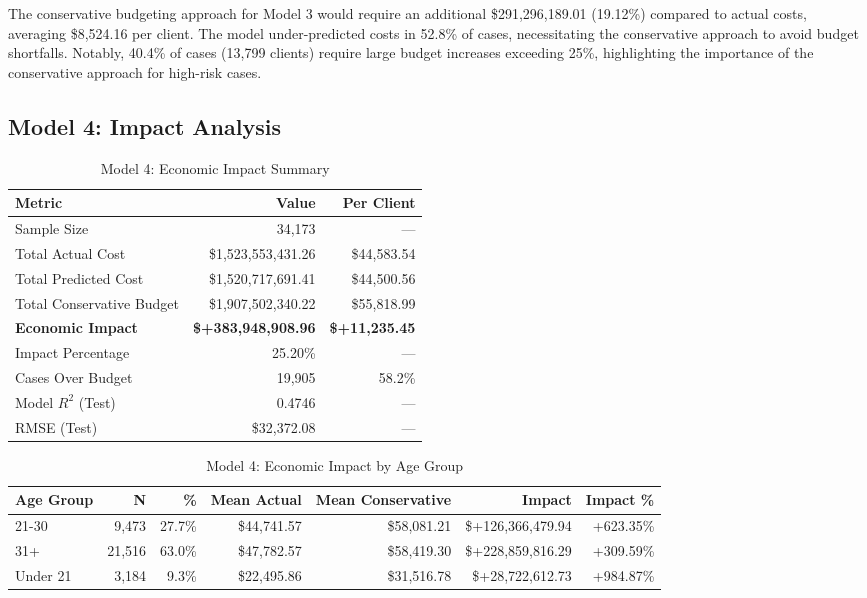 The conservative budgeting approach for Model 3 would require an additional \$291,296,189.01 (19.12\%) compared to actual costs, averaging \$8,524.16 per client. The model under-predicted costs in 52.8\% of cases, necessitating the conservative approach to avoid budget shortfalls. Notably, 40.4\% of cases (13,799 clients) require large budget increases exceeding 25\%, highlighting the importance of the conservative approach for high-risk cases. 

\clearpage

\subsection{Model 4: Impact Analysis}
\label{subsec:model4_impact}

\begin{table}[htbp]
\centering
\small
\caption{Model 4: Economic Impact Summary}
\label{tab:model4_impact_summary}
\begin{tabular}{lrr}
\toprule
\textbf{Metric} & \textbf{Value} & \textbf{Per Client} \\
\midrule
Sample Size & 34,173 & --- \\
\midrule
Total Actual Cost & \$1,523,553,431.26 & \$44,583.54 \\
Total Predicted Cost & \$1,520,717,691.41 & \$44,500.56 \\
Total Conservative Budget & \$1,907,502,340.22 & \$55,818.99 \\
\midrule
\textbf{Economic Impact} & \textbf{\$+383,948,908.96} & \textbf{\$+11,235.45} \\
Impact Percentage & 25.20\% & --- \\
\midrule
Cases Over Budget & 19,905 & 58.2\% \\
\midrule
Model $R^2$ (Test) & 0.4746 & --- \\
RMSE (Test) & \$32,372.08 & --- \\
\bottomrule
\end{tabular}
\end{table}

\begin{table}[htbp]
\centering
\small
\caption{Model 4: Economic Impact by Age Group}
\label{tab:model4_impact_age}
\begin{tabular}{lrrrrrr}
\toprule
\textbf{Age Group} & \textbf{N} & \textbf{\%} & \textbf{Mean Actual} & \textbf{Mean Conservative} & \textbf{Impact} & \textbf{Impact \%} \\
\midrule
21-30 & 9,473 & 27.7\% & \$44,741.57 & \$58,081.21 & \$+126,366,479.94 & +623.35\% \\
31+ & 21,516 & 63.0\% & \$47,782.57 & \$58,419.30 & \$+228,859,816.29 & +309.59\% \\
Under 21 & 3,184 & 9.3\% & \$22,495.86 & \$31,516.78 & \$+28,722,612.73 & +984.87\% \\
\bottomrule
\end{tabular}
\end{table}

